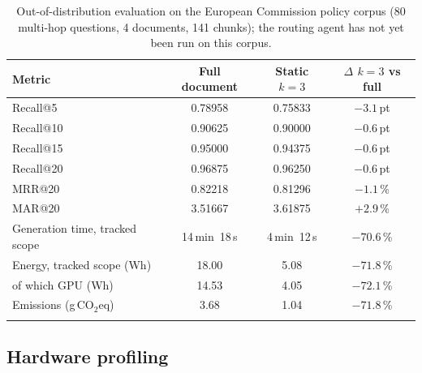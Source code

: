 \documentclass[pdflatex,sn-mathphys-num]{sn-jnl}
\makeatletter
\newcommand{\gco}{g\,CO$_2$eq}
\newcommand{\Rec}[1]{Recall@#1}
\newcommand{\MRR}[1]{MRR@#1}
\newcommand{\MAR}[1]{MAR@#1}
\theoremstyle{thmstyleone}%
\theoremstyle{thmstylethree}%
\makeatother
\begin{document}
\begin{table}[htbp]
\caption{Out-of-distribution evaluation on the European Commission policy corpus (80 multi-hop questions, 4 documents, 141 chunks); the routing agent has not yet been run on this corpus.}\label{tab:policy}
\begin{tabular}{@{}lccc@{}}
\toprule
Metric & Full document & Static $k=3$ & $\Delta$ $k=3$ vs full \\
\midrule
\Rec{5} & 0.78958 & 0.75833 & $-3.1$\,pt \\
\Rec{10} & 0.90625 & 0.90000 & $-0.6$\,pt \\
\Rec{15} & 0.95000 & 0.94375 & $-0.6$\,pt \\
\Rec{20} & 0.96875 & 0.96250 & $-0.6$\,pt \\
\MRR{20} & 0.82218 & 0.81296 & $-1.1$\,\% \\
\MAR{20} & 3.51667 & 3.61875 & $+2.9$\,\% \\
Generation time, tracked scope & 14\,min~18\,s & 4\,min~12\,s & $-70.6$\,\% \\
Energy, tracked scope (Wh) & 18.00 & 5.08 & $-71.8$\,\% \\
\quad of which GPU (Wh) & 14.53 & 4.05 & $-72.1$\,\% \\
Emissions (\gco{}) & 3.68 & 1.04 & $-71.8$\,\% \\
\botrule
\end{tabular}
\end{table}

\subsection{Hardware profiling}\label{sec:profiling}
\end{document}
